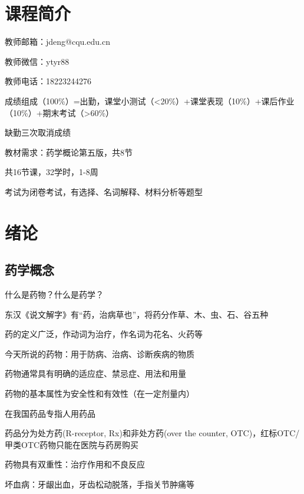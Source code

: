 \def\lecturer{邓军}
\def\noter{THF}
\def\className{Medicine Outline}
\def\term{III-B}



\maketitle
\tableofcontents
\section*{课程简介}%
\label{sec:课程简介}
教师邮箱：jdeng@cqu.edu.cn

教师微信：ytyr88

教师电话：18223244276

成绩组成（100\%）=出勤，课堂小测试（<20\%）+课堂表现（10\%）+课后作业（10\%）+期末考试（>60\%）

缺勤三次取消成绩

教材需求：药学概论第五版，共8节

共16节课，32学时，1-8周

考试为闭卷考试，有选择、名词解释、材料分析等题型
\section{绪论}%
\label{sec:绪论}
\subsection{药学概念}%
\label{sub:药学概念}
\begin{question}
    什么是药物？什么是药学？
\end{question}
东汉《说文解字》有“药，治病草也”，将药分作草、木、虫、石、谷五种

药的定义广泛，作动词为治疗，作名词为花名、火药等

\begin{notation}
    今天所说的药物：用于防病、治病、诊断疾病的物质
\end{notation}
药物通常具有明确的适应症、禁忌症、用法和用量

药物的基本属性为安全性和有效性（在一定剂量内）

在我国药品专指人用药品

\begin{notation}
    药品分为处方药(R-receptor, Rx)和非处方药(over the counter, OTC)，红标OTC/甲类OTC药物只能在医院与药房购买
\end{notation}
\begin{notation}
    药物具有双重性：治疗作用和不良反应
\end{notation}
坏血病：牙龈出血，牙齿松动脱落，手指关节肿痛等

